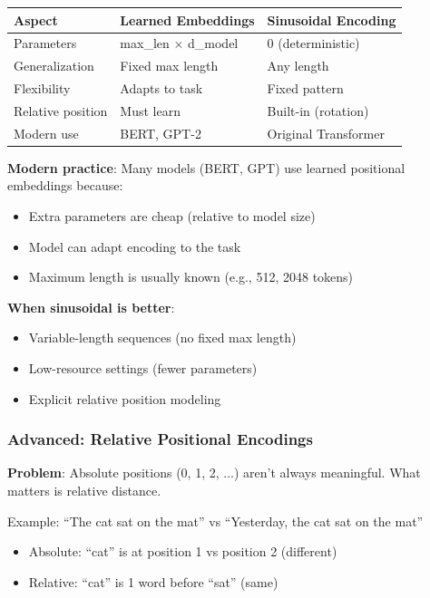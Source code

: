 \begin{center}
\begin{tabular}{lll}
\hline
\textbf{Aspect} & \textbf{Learned Embeddings} & \textbf{Sinusoidal Encoding} \\
\hline
Parameters & max\_len $\times$ d\_model & 0 (deterministic) \\
Generalization & Fixed max length & Any length \\
Flexibility & Adapts to task & Fixed pattern \\
Relative position & Must learn & Built-in (rotation) \\
Modern use & BERT, GPT-2 & Original Transformer \\
\hline
\end{tabular}
\end{center}

\textbf{Modern practice}: Many models (BERT, GPT) use learned positional embeddings because:
\begin{itemize}
\item Extra parameters are cheap (relative to model size)
\item Model can adapt encoding to the task
\item Maximum length is usually known (e.g., 512, 2048 tokens)
\end{itemize}

\textbf{When sinusoidal is better}:
\begin{itemize}
\item Variable-length sequences (no fixed max length)
\item Low-resource settings (fewer parameters)
\item Explicit relative position modeling
\end{itemize}

\subsubsection{Advanced: Relative Positional Encodings}

\textbf{Problem}: Absolute positions (0, 1, 2, ...) aren't always meaningful. What matters is relative distance.

Example: ``The cat sat on the mat'' vs ``Yesterday, the cat sat on the mat''
\begin{itemize}
\item Absolute: ``cat'' is at position 1 vs position 2 (different)
\item Relative: ``cat'' is 1 word before ``sat'' (same)
\end{itemize}

